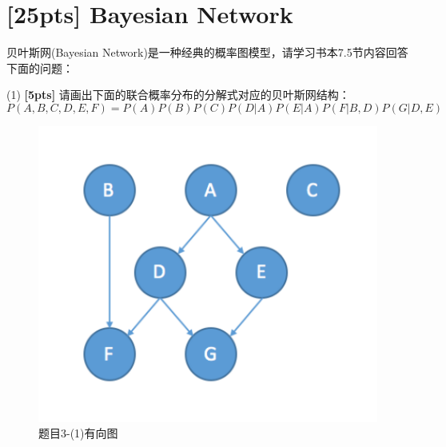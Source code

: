 \documentclass[a4paper,UTF8]{article}
\numberwithin{equation}{section}
\theoremstyle{definition}
\begin{document}
\section{\textbf{[25pts]} Bayesian Network}
贝叶斯网(Bayesian Network)是一种经典的概率图模型，请学习书本7.5节内容回答下面的问题：

(1) \textbf{[5pts]} 请画出下面的联合概率分布的分解式对应的贝叶斯网结构：
\begin{equation*}
P(A, B, C, D, E, F) = P(A)P(B)P(C)P(D|A)P(E|A)P(F|B, D)P(G|D, E)
\end{equation*}
\begin{figure}[h]
\label{3-1.pdf}
\centering
\includegraphics[scale=0.75]{3-1.pdf}
\caption{题目3-(1)有向图}
\end{figure}
\end{document}
